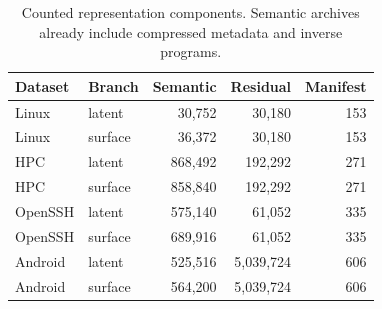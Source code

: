 \begin{longtable}{llrrr}
\caption{Counted representation components. Semantic archives already include compressed metadata and inverse programs.}\\
\toprule
Dataset & Branch & Semantic & Residual & Manifest \\ \midrule\endhead
Linux & latent & 30,752 & 30,180 & 153 \\
Linux & surface & 36,372 & 30,180 & 153 \\
HPC & latent & 868,492 & 192,292 & 271 \\
HPC & surface & 858,840 & 192,292 & 271 \\
OpenSSH & latent & 575,140 & 61,052 & 335 \\
OpenSSH & surface & 689,916 & 61,052 & 335 \\
Android & latent & 525,516 & 5,039,724 & 606 \\
Android & surface & 564,200 & 5,039,724 & 606 \\
\bottomrule\end{longtable}
